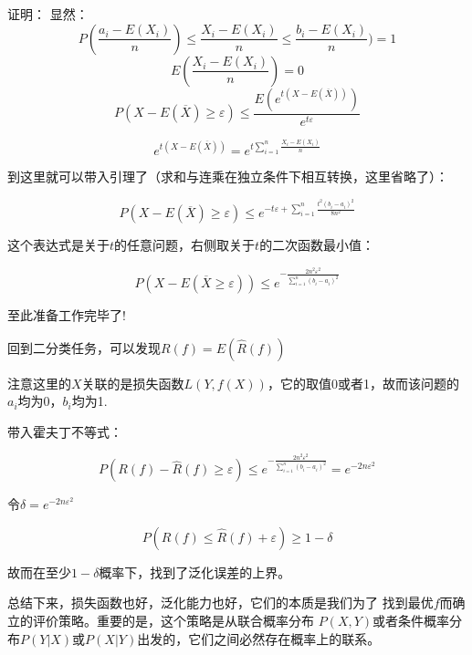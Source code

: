 \documentclass{article}
\begin{document}
证明：
显然：
\[P(\frac{a_i-E(X_i)}{n})\le \frac{X_i-E(X_i)}{n}\le \frac{b_i-E(X_i)}{n})=1\]
\[E(\frac{X_i-E(X_i)}{n})=0\]
\[P(X-E(\overline{X}) \ge \varepsilon ) \le \frac{E(e^{t(X-E(\overline{X}))})}{e^{t\varepsilon }}\]

\[e^{t(X-E(\overline{X}))}=e^{t\sum_{i=1}^{n}\frac{X_i-E(X_i)}{n}}\]

到这里就可以带入引理了（求和与连乘在独立条件下相互转换，这里省略了）：

\[P(X-E(\overline{X})\ge \varepsilon) \le e^{-t\varepsilon +\sum_{i=1}^{n}\frac{t^2(b_i-a_i)^2}{8n^2}}\]

这个表达式是关于$t$的任意问题，右侧取关于$t$的二次函数最小值：

\[P(X-E(\overline{X}\ge \varepsilon ))\le e^{-\frac{2n^2\varepsilon ^2}{\sum_{i=1}^{n}(b_i-a_i)^2}}\]


至此准备工作完毕了!

回到二分类任务，可以发现$R(f)=E(\widehat{R}(f))$

注意这里的$X$关联的是损失函数$L(Y,f(X))$，它的取值0或者1，故而该问题的$a_i$均为0，$b_i$均为1.

带入霍夫丁不等式：

\[P(R(f)-\widehat{R}(f)\ge \varepsilon )\le e^{-\frac{2n^2\varepsilon ^2}{\sum_{i=1}^{n}(b_i-a_i)^2}}=e^{-2n\varepsilon ^2}\]

令$\delta=e^{-2n\varepsilon ^2} $

\[P(R(f) \le \widehat{R}(f)+\varepsilon )\ge 1-\delta \]

故而在至少$1-\delta $概率下，找到了泛化误差的上界。

总结下来，损失函数也好，泛化能力也好，它们的本质是我们为了
找到最优$f$而确立的评价策略。重要的是，这个策略是从联合概率分布
$P(X,Y)$或者条件概率分布$P(Y|X)$或$P(X|Y)$出发的，它们之间必然存在概率上的联系。
\end{document}
